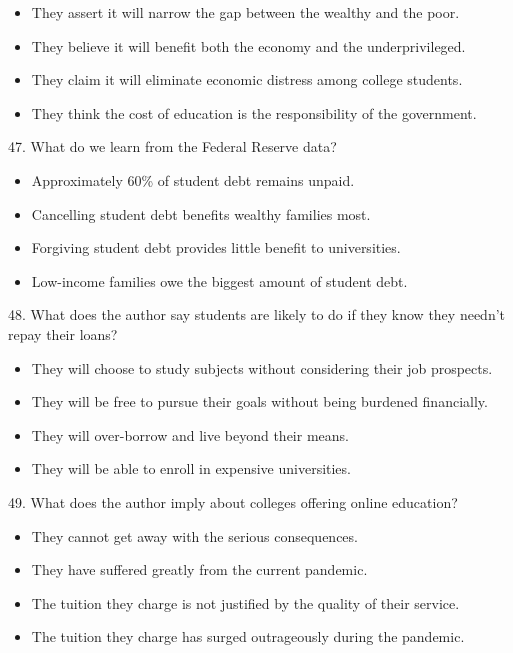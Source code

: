 \documentclass[UTF8,11pt]{ctexart}
\begin{document}
\begin{itemize}[leftmargin=2em,itemsep=.2em,topsep=.4em]\item[A.] They assert it will narrow the gap between the wealthy and the poor.
\item[B.] They believe it will benefit both the economy and the underprivileged.
\end{itemize}

\begin{itemize}[leftmargin=2em,itemsep=.2em,topsep=.4em]\item[C.] They claim it will eliminate economic distress among college students.
\item[D.] They think the cost of education is the responsibility of the government.
\end{itemize}

47. What do we learn from the Federal Reserve data?


\begin{itemize}[leftmargin=2em,itemsep=.2em,topsep=.4em]\item[A.] Approximately 60\% of student debt remains unpaid.
\item[B.] Cancelling student debt benefits wealthy families most.
\item[C.] Forgiving student debt provides little benefit to universities.
\item[D.] Low-income families owe the biggest amount of student debt.
\end{itemize}

48. What does the author say students are likely to do if they know they needn’t repay their loans?


\begin{itemize}[leftmargin=2em,itemsep=.2em,topsep=.4em]\item[A.] They will choose to study subjects without considering their job prospects.
\item[B.] They will be free to pursue their goals without being burdened financially.
\item[C.] They will over-borrow and live beyond their means.
\item[D.] They will be able to enroll in expensive universities.
\end{itemize}

49. What does the author imply about colleges offering online education?


\begin{itemize}[leftmargin=2em,itemsep=.2em,topsep=.4em]\item[A.] They cannot get away with the serious consequences.
\item[B.] They have suffered greatly from the current pandemic.
\item[C.] The tuition they charge is not justified by the quality of their service.
\item[D.] The tuition they charge has surged outrageously during the pandemic.
\end{itemize}
\end{document}
